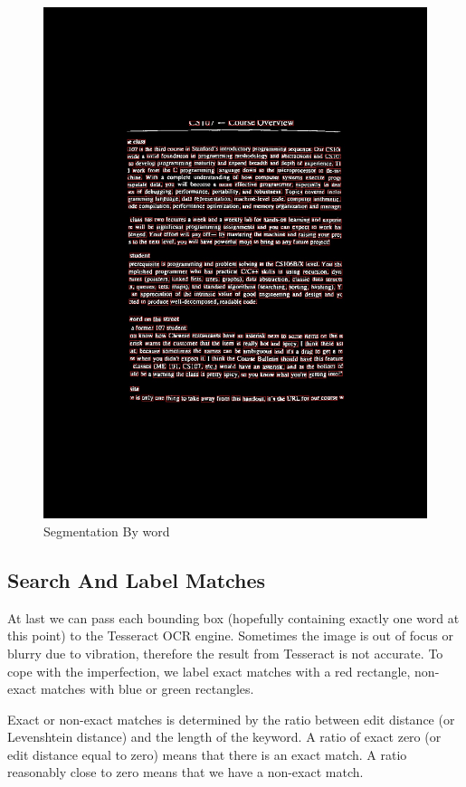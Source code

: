 \documentclass[conference]{IEEEtran}
\begin{document}
\begin{figure}
\center
\includegraphics[scale=0.15]{word_with_bounding_box.jpg}
\caption{Segmentation By word}
\label{wordbbox}
\end{figure}

\subsection{Search And Label Matches}
At last we can pass each bounding box (hopefully containing exactly one word at this point) to the Tesseract OCR engine.  Sometimes the image is out of focus or blurry due to vibration, therefore the result from Tesseract is not accurate.  To cope with the imperfection, we label exact matches with a red rectangle, non-exact matches with blue or green rectangles.

Exact or non-exact matches is determined by the ratio between edit distance (or Levenshtein distance) and the length of the keyword.  A ratio of exact zero (or edit distance equal to zero) means that there is an exact match.  A ratio reasonably close to zero means that we have a non-exact match.
\end{document}
